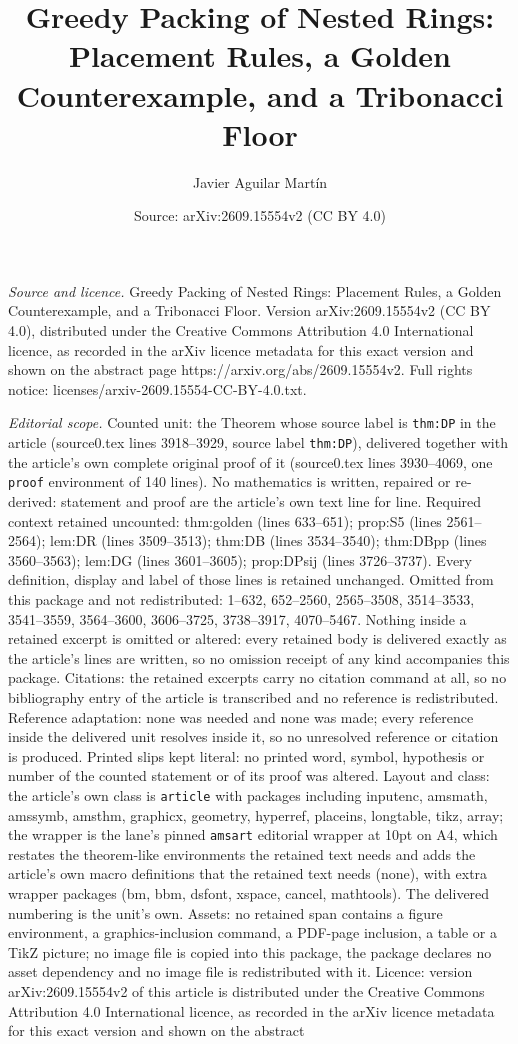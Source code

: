 \documentclass[10pt,a4paper]{amsart}
\title[Greedy Packing of Nested Rings: Placement Rules, a Golden Co]{Greedy Packing of Nested Rings: Placement Rules, a Golden Counterexample, and a Tribonacci Floor}
\author{Javier Aguilar Mart\'in}
\date{Source: arXiv:2609.15554v2 (CC BY 4.0)}
\begin{document}
\maketitle

\noindent\emph{Source and licence.} Greedy Packing of Nested Rings: Placement Rules, a Golden Counterexample, and a Tribonacci Floor. Version arXiv:2609.15554v2 (CC BY 4.0), distributed under the Creative Commons Attribution 4.0 International licence, as recorded in the arXiv licence metadata for this exact version and shown on the abstract page https://arxiv.org/abs/2609.15554v2. Full rights notice: licenses/arxiv-2609.15554-CC-BY-4.0.txt.\par\smallskip

\noindent\textit{Editorial scope.} Counted unit: the Theorem whose source label is \texttt{thm:DP} in the article (source0.tex lines 3918--3929, source label \texttt{thm:DP}), delivered together with the article's own complete original proof of it (source0.tex lines 3930--4069, one \texttt{proof} environment of 140 lines). No mathematics is written, repaired or re-derived: statement and proof are the article's own text line for line. Required context retained uncounted: thm:golden (lines 633--651); prop:S5 (lines 2561--2564); lem:DR (lines 3509--3513); thm:DB (lines 3534--3540); thm:DBpp (lines 3560--3563); lem:DG (lines 3601--3605); prop:DPsij (lines 3726--3737). Every definition, display and label of those lines is retained unchanged. Omitted from this package and not redistributed: 1--632, 652--2560, 2565--3508, 3514--3533, 3541--3559, 3564--3600, 3606--3725, 3738--3917, 4070--5467. Nothing inside a retained excerpt is omitted or altered: every retained body is delivered exactly as the article's lines are written, so no omission receipt of any kind accompanies this package. Citations: the retained excerpts carry no citation command at all, so no bibliography entry of the article is transcribed and no reference is redistributed. Reference adaptation: none was needed and none was made; every reference inside the delivered unit resolves inside it, so no unresolved reference or citation is produced. Printed slips kept literal: no printed word, symbol, hypothesis or number of the counted statement or of its proof was altered. Layout and class: the article's own class is \texttt{article} with packages including inputenc, amsmath, amssymb, amsthm, graphicx, geometry, hyperref, placeins, longtable, tikz, array; the wrapper is the lane's pinned \texttt{amsart} editorial wrapper at 10pt on A4, which restates the theorem-like environments the retained text needs and adds the article's own macro definitions that the retained text needs (none), with extra wrapper packages (bm, bbm, dsfont, xspace, cancel, mathtools). The delivered numbering is the unit's own. Assets: no retained span contains a figure environment, a graphics-inclusion command, a PDF-page inclusion, a table or a TikZ picture; no image file is copied into this package, the package declares no asset dependency and no image file is redistributed with it. Licence: version arXiv:2609.15554v2 of this article is distributed under the Creative Commons Attribution 4.0 International licence, as recorded in the arXiv licence metadata for this exact version and shown on the abstract 
\end{document}
